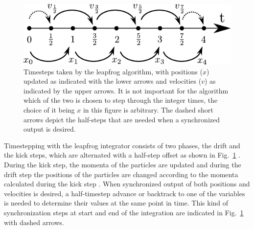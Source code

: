 \documentclass[english, oneside]{HYgradu}
\begin{document}


%    

\begin{figure}
\centering
\includegraphics{kuvat/tex/leapfrog.pdf}
\caption{Timesteps taken by the leapfrog algorithm, with positions ($x$) updated as indicated with the lower arrows and velocities ($v$) as indicated by the upper arrows. It is not important for the algorithm which of the two is chosen to step through the integer times, the choice of it being $x$ in this figure is arbitrary. The dashed short arrows depict the half-steps that are needed when a synchronized output is desired.}\label{fig:leapfrog}
\end{figure}

Timestepping with the leapfrog integrator consists of two phases, the drift and the kick steps, which are alternated with a half-step offset as shown in Fig.\ \ref{fig:leapfrog} \citep{binney2008galactic}. During the kick step, the momenta of the particles are updated and during the drift step the positions of the particles are changed according to the momenta calculated during the kick step \citep{binney2008galactic}. When synchronized output of both positions and velocities is desired, a half-timestep advance or backtrack to one of the variables is needed to determine their values at the same point in time. This kind of synchronization steps at start and end of the integration are indicated in Fig.\ \ref{fig:leapfrog} with dashed arrows.
\end{document}
